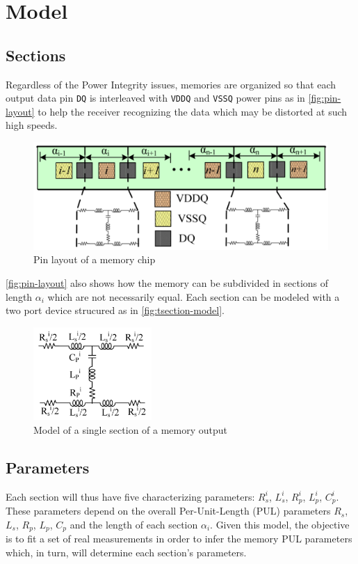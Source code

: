 \section{Model}
\subsection{Sections}
Regardless of the Power Integrity issues, memories are organized so that each output data pin \texttt{DQ} is interleaved with \texttt{VDDQ} and \texttt{VSSQ} power pins as in \autoref{fig:pin-layout} to help the receiver recognizing the data which may be distorted at such high speeds.
\begin{figure}[htbp]
	\center
	\includegraphics[width = \textwidth]{img/pin-layout}
	\caption{Pin layout of a memory chip}
	\label{fig:pin-layout}
\end{figure}

\autoref{fig:pin-layout} also shows how the memory can be subdivided in sections of length $\alpha_i$ which are not necessarily equal. Each section can be modeled with a two port device strucured as in \autoref{fig:tsection-model}.
\begin{figure}[htbp]
	\center
	\includegraphics[width = 0.4\textwidth]{img/tsection-model}
	\caption{Model of a single section of a memory output}
	\label{fig:tsection-model}
\end{figure}

\subsection{Parameters}
\label{ssec:parameters}
Each section will thus have five characterizing parameters: $R^i_s$, $L^i_s$, $R^i_p$, $L^i_p$, $C^i_p$. These parameters depend on the overall Per-Unit-Length (PUL) parameters $R_s$, $L_s$, $R_p$, $L_p$, $C_p$ and the length of each section $\alpha_i$. Given this model, the objective is to fit a set of real measurements in order to infer the memory PUL parameters which, in turn, will determine each section's parameters.

